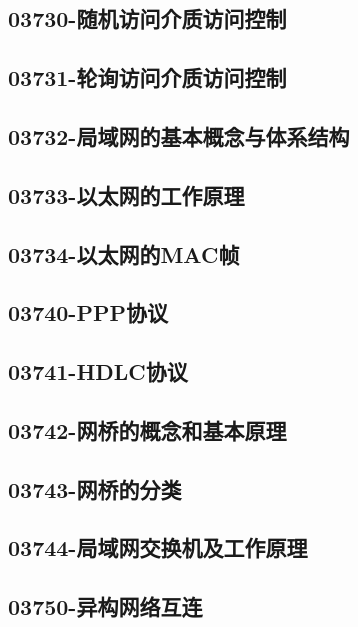 \subsection{03730-随机访问介质访问控制}

\subsection{03731-轮询访问介质访问控制}

\subsection{03732-局域网的基本概念与体系结构}

\subsection{03733-以太网的工作原理}

\subsection{03734-以太网的MAC帧}

\subsection{03740-PPP协议}

\subsection{03741-HDLC协议}

\subsection{03742-网桥的概念和基本原理}

\subsection{03743-网桥的分类}

\subsection{03744-局域网交换机及工作原理}

\subsection{03750-异构网络互连}

